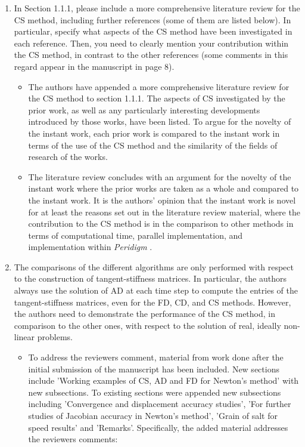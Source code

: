 \documentclass{article}
\begin{document}
\begin{enumerate}
  \item
     In Section 1.1.1, please include a more comprehensive literature review for
     the CS method, including further references (some of them are listed below).
     In particular, specify what aspects of the CS method have been investigated in
     each reference. Then, you need to clearly mention your contribution within
     the CS method, in contrast to the other references (some comments in this
     regard appear in the manuscript in page 8).

{\color{red}
  \begin{itemize}
     \item 
         The authors have appended a more comprehensive literature review for the CS method to section 1.1.1.
         The aspects of CS investigated by the prior work, as well as any particularly interesting
         developments introduced by those works, have been listed. To argue for the novelty of the instant work,
         each prior work is compared to the instant work in terms of the use of the CS method and the similarity of the fields of research of the works.
     \item
         The literature review concludes with an argument for the novelty of the instant
         work where the prior works are taken as a whole and compared to the instant work. It is the authors' opinion
         that the instant work is novel for at least the reasons set out in the literature review material, where
         the contribution to the CS method is in the comparison to other methods in terms of computational
         time,  parallel implementation, and implementation within \emph{Peridigm} .
  \end{itemize}}


  \item
      The comparisons of the different algorithms are only performed with respect to the
      construction of tangent-stiffness matrices. In particular, the authors always use the
      solution of AD at each time step to compute the entries of the tangent-stiffness
      matrices, even for the FD, CD, and CS methods. However, the authors need to
      demonstrate the performance of the CS method, in comparison to the other ones,
      with respect to the solution of real, ideally non-linear problems. 

{\color{red}
  \begin{itemize}
    \item 
        To address the reviewers comment, material from work done after the
        initial submission of the manuscript has been included. New sections
        include 'Working examples of CS, AD and FD for Newton's method' with
        new subsections. To existing sections were appended new subsections
        including 'Convergence and displacement accuracy studies', 'For further
        studies of Jacobian accuracy in Newton's method', 'Grain of salt for
        speed results' and 'Remarks'. Specifically, the added material addresses
        the reviewers comments:
    \end{itemize}}


\end{enumerate}
\end{document}
